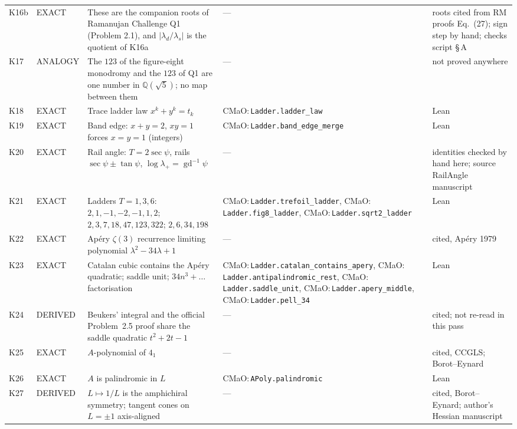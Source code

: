 \documentclass[11pt]{article}
\theoremstyle{definition}
\newcommand{\lean}[1]{\texttt{\small #1}}
\begin{document}
{\begin{longtable}{@{}L{0.05\textwidth}L{0.12\textwidth}L{0.26\textwidth}L{0.27\textwidth}L{0.17\textwidth}@{}}
K16b & EXACT & These are the companion roots of Ramanujan Challenge Q1 (Problem 2.1), and $|\lambda_d/\lambda_s|$ is the quotient of K16a & --- & roots cited from RM proofs Eq.~(27); sign step by hand; checks script \S\,A\\
K17 & ANALOGY & The $123$ of the figure-eight monodromy and the $123$ of Q1 are one number in $\mathbb Q(\sqrt5)$; no map between them & --- & not proved anywhere\\
K18 & EXACT & Trace ladder law $x^k+y^k=t_k$ & CMaO:\,\lean{Ladder.\allowbreak{}ladder\_\allowbreak{}law} & Lean\\
K19 & EXACT & Band edge: $x+y=2$, $xy=1$ forces $x=y=1$ (integers) & CMaO:\,\lean{Ladder.\allowbreak{}band\_\allowbreak{}edge\_\allowbreak{}merge} & Lean\\
K20 & EXACT & Rail angle: $T=2\sec\psi$, rails $\sec\psi\pm\tan\psi$, $\log\lambda_+=\operatorname{gd}^{-1}\psi$ & --- & identities checked by hand here; source RailAngle manuscript\\
K21 & EXACT & Ladders $T=1,3,6$: $2,1,-1,-2,-1,1,2$; $2,3,7,18,47,123,322$; $2,6,34,198$ & CMaO:\,\lean{Ladder.\allowbreak{}trefoil\_\allowbreak{}ladder}, CMaO:\,\lean{Ladder.\allowbreak{}fig8\_\allowbreak{}ladder}, CMaO:\,\lean{Ladder.\allowbreak{}sqrt2\_\allowbreak{}ladder} & Lean\\
K22 & EXACT & Ap\'ery $\zeta(3)$ recurrence limiting polynomial $\lambda^2-34\lambda+1$ & --- & cited, Ap\'ery 1979\\
K23 & EXACT & Catalan cubic contains the Ap\'ery quadratic; saddle unit; $34n^3+\dots$ factorisation & CMaO:\,\lean{Ladder.\allowbreak{}catalan\_\allowbreak{}contains\_\allowbreak{}apery}, CMaO:\,\lean{Ladder.\allowbreak{}antipalindromic\_\allowbreak{}rest}, CMaO:\,\lean{Ladder.\allowbreak{}saddle\_\allowbreak{}unit}, CMaO:\,\lean{Ladder.\allowbreak{}apery\_\allowbreak{}middle}, CMaO:\,\lean{Ladder.\allowbreak{}pell\_\allowbreak{}34} & Lean\\
K24 & DERIVED & Beukers' integral and the official Problem~2.5 proof share the saddle quadratic $t^2+2t-1$ & --- & cited; not re-read in this pass\\
K25 & EXACT & $A$-polynomial of $4_1$ & --- & cited, CCGLS; Borot--Eynard\\
K26 & EXACT & $A$ is palindromic in $L$ & CMaO:\,\lean{APoly.\allowbreak{}palindromic} & Lean\\
K27 & DERIVED & $L\mapsto1/L$ is the amphichiral symmetry; tangent cones on $L=\pm1$ axis-aligned & --- & cited, Borot--Eynard; author's Hessian manuscript\\

\end{longtable}}
\end{document}

